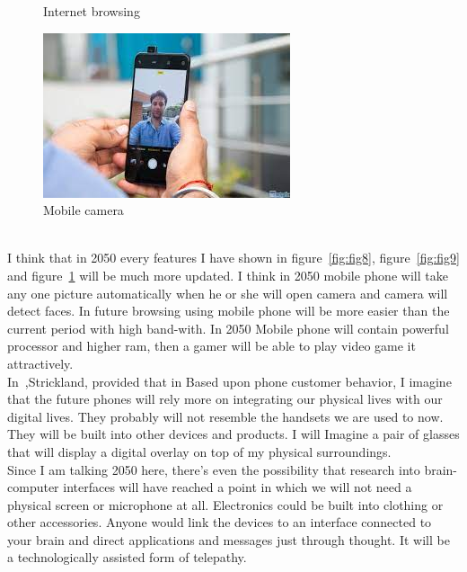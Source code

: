 \begin{figure}[h]
\begin{minipage}[b]{.49\textwidth}
     \caption{Internet browsing} 
     \label{fig:fig9}
    \end{minipage} 
    \begin{minipage}[b]{.49\textwidth}
    \includegraphics[width = 1\linewidth]{pic/camera.jpeg}
     \caption{Mobile camera} 
     \label{fig:fig10}
    \end{minipage}
\end{figure}\\
I think that in 2050 every features I have shown in figure~\ref{fig:fig8}, figure~\ref{fig:fig9} and figure~\ref{fig:fig10} will be much more updated. I think in 2050 mobile phone will take any one picture automatically when he or she will open camera and camera will detect faces. In future browsing using mobile phone will be more easier than the current period with high band-with. In 2050 Mobile phone will contain powerful processor and higher ram, then a gamer will be able to play video game it attractively.  \\
In~\cite{electronics.howstuffworks.comWebsite},Strickland, provided that in Based upon phone customer behavior, I imagine that the future phones will rely more on integrating our physical lives with our digital lives. They probably will not resemble the handsets we are used to now. They will be built into other devices and products. I will Imagine a pair of glasses that will display a digital overlay on top of my physical surroundings.\\
Since I am  talking 2050 here, there's even the possibility that research into brain-computer interfaces will have reached a point in which we will not need a physical screen or microphone at all. Electronics could be built into clothing or other accessories. Anyone would link the devices to an interface connected to your brain and direct applications and messages just through thought. It will be a technologically assisted form of telepathy.\\
